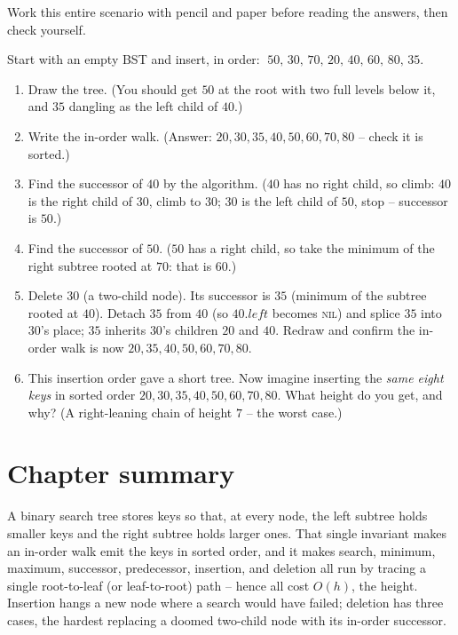\begin{labbox}
Work this entire scenario with pencil and paper before reading the answers, then check yourself.

Start with an empty BST and insert, in order: $\;50,\,30,\,70,\,20,\,40,\,60,\,80,\,35$.
\begin{enumerate}
  \item Draw the tree. (You should get $50$ at the root with two full levels below it, and $35$
        dangling as the left child of $40$.)
  \item Write the in-order walk. (Answer: $20,30,35,40,50,60,70,80$ -- check it is sorted.)
  \item Find the successor of $40$ by the algorithm. ($40$ has no right child, so climb: $40$ is
        the right child of $30$, climb to $30$; $30$ is the left child of $50$, stop -- successor
        is $50$.)
  \item Find the successor of $50$. ($50$ has a right child, so take the minimum of the right
        subtree rooted at $70$: that is $60$.)
  \item Delete $30$ (a two-child node). Its successor is $35$ (minimum of the subtree rooted at
        $40$). Detach $35$ from $40$ (so $40.\mathit{left}$ becomes \textsc{nil}) and splice $35$
        into $30$'s place; $35$ inherits $30$'s children $20$ and $40$. Redraw
        and confirm the in-order walk is now $20,35,40,50,60,70,80$.
  \item This insertion order gave a short tree. Now imagine inserting the \emph{same eight keys}
        in sorted order $20,30,35,40,50,60,70,80$. What height do you get, and why? (A
        right-leaning chain of height $7$ -- the worst case.)
\end{enumerate}
\end{labbox}

\section*{Chapter summary}

A binary search tree stores keys so that, at every node, the left subtree holds smaller keys
and the right subtree holds larger ones. That single invariant makes an in-order walk emit the
keys in sorted order, and it makes search, minimum, maximum, successor, predecessor, insertion,
and deletion all run by tracing a single root-to-leaf (or leaf-to-root) path -- hence all cost
$O(h)$, the height. Insertion hangs a new node where a search would have failed; deletion has
three cases, the hardest replacing a doomed two-child node with its in-order successor.

